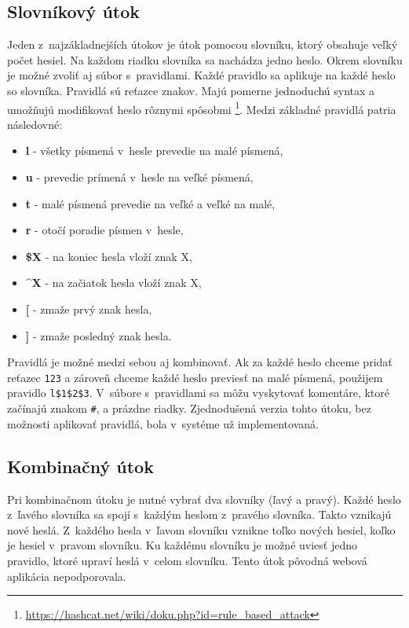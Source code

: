 \documentclass[zadani,slovak]{fitthesis}
\begin{document}
\subsection{Slovníkový útok} \label{dictAttack}
Jeden z~najzákladnejších útokov je útok pomocou slovníku, ktorý obsahuje veľký počet hesiel. Na každom riadku slovníka sa nachádza jedno heslo. Okrem slovníku je možné zvoliť aj súbor s~pravidlami. Každé pravidlo sa aplikuje na každé heslo so slovníka. Pravidlá sú reťazce znakov. Majú pomerne jednoduchú syntax a umožňujú modifikovať heslo rôznymi spôsobmi \footnote{\url{https://hashcat.net/wiki/doku.php?id=rule_based_attack}}. Medzi základné pravidlá patria následovné:
\begin{itemize}
    \item \textbf{l} - všetky písmená v~hesle prevedie na malé písmená,
    \item \textbf{u} - prevedie prímená v~hesle na veľké písmená,
    \item \textbf{t} - malé písmená prevedie na veľké a veľké na malé,
    \item \textbf{r} - otočí poradie písmen v~hesle,
    \item \textbf{\$X} - na koniec hesla vloží znak X,
    \item \textbf{\^{}X} - na začiatok hesla vloží znak X,
    \item \textbf{[} - zmaže prvý znak hesla,
    \item \textbf{]} - zmaže posledný znak hesla.
\end{itemize}
Pravidlá je možné medzi sebou aj kombinovať. Ak za každé heslo chceme pridať reťazec \texttt{123} a zároveň chceme každé heslo previesť na malé písmená, použijem pravidlo \texttt{l\$1\$2\$3}. V~súbore s~pravidlami sa môžu vyskytovať komentáre, ktoré začínajú znakom \texttt{\#}, a prázdne riadky.
Zjednodušená verzia tohto útoku, bez možnosti aplikovať pravidlá, bola v~systéme už implementovaná.

\subsection{Kombinačný útok} \label{combAttack}
Pri kombinačnom útoku je nutné vybrať dva slovníky (ľavý a pravý). Každé heslo z~ľavého slovníka sa spojí s~každým heslom z~pravého slovníka. Takto vznikajú nové heslá. Z~každého hesla v~ľavom slovníku vznikne toľko nových hesiel, koľko je hesiel v~pravom slovníku. Ku každému slovníku je možné uviesť jedno pravidlo, ktoré upraví heslá v~celom slovníku. Tento útok pôvodná webová aplikácia nepodporovala.
\end{document}
